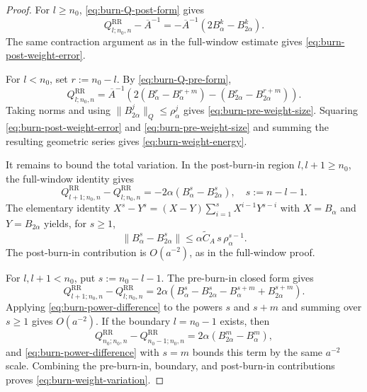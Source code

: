 \begin{proof} For $l \ge n_{0}$, \eqref{eq:burn-Q-post-form} gives
\[
Q_{l; n_{0}, n}^{\mathrm{RR}} - \overline{A}^{-1}
  = -\overline{A}^{-1} \left( 2 B_{\alpha}^{k} - B_{2 \alpha}^{k} \right).
\]
The same contraction argument as in the full-window estimate gives
\eqref{eq:burn-post-weight-error}.

For $l < n_{0}$, set $r := n_{0} - l$. By \eqref{eq:burn-Q-pre-form},
\[
Q_{l; n_{0}, n}^{\mathrm{RR}}
  = \overline{A}^{-1} \left( 2 \left( B_{\alpha}^{r} - B_{\alpha}^{r + m} \right)
      - \left( B_{2 \alpha}^{r} - B_{2 \alpha}^{r + m} \right) \right).
\]
Taking norms and using $\lVert B_{2 \alpha}^{j} \rVert_{Q} \le \rho_{\alpha}^{j}$ gives
\eqref{eq:burn-pre-weight-size}. Squaring \eqref{eq:burn-post-weight-error} and
\eqref{eq:burn-pre-weight-size} and summing the resulting geometric series gives
\eqref{eq:burn-weight-energy}.

It remains to bound the total variation. In the post-burn-in region
$l, l + 1 \ge n_{0}$, the full-window identity gives
\[
Q_{l + 1; n_{0}, n}^{\mathrm{RR}} - Q_{l; n_{0}, n}^{\mathrm{RR}}
  = -2 \alpha \left( B_{\alpha}^{s} - B_{2 \alpha}^{s} \right),
\quad s := n - l - 1.
\]
The elementary identity
$X^{s} - Y^{s} = (X - Y) \sum_{i = 1}^{s} X^{i - 1} Y^{s - i}$ with
$X = B_{\alpha}$ and $Y = B_{2 \alpha}$ yields, for $s \ge 1$,
\begin{equation}
\lVert B_{\alpha}^{s} - B_{2 \alpha}^{s} \rVert
  \le \alpha \tilde{C}_{A} \, s \, \rho_{\alpha}^{s - 1}.
\label{eq:burn-power-difference}
\end{equation}
The post-burn-in contribution is $O(a^{-2})$, as in the full-window proof.

For $l, l + 1 < n_{0}$, put $s := n_{0} - l - 1$. The pre-burn-in closed form gives
\[
Q_{l + 1; n_{0}, n}^{\mathrm{RR}} - Q_{l; n_{0}, n}^{\mathrm{RR}}
  = 2 \alpha \left( B_{\alpha}^{s} - B_{2 \alpha}^{s}
      - B_{\alpha}^{s + m} + B_{2 \alpha}^{s + m} \right).
\]
Applying \eqref{eq:burn-power-difference} to the powers $s$ and $s + m$ and summing
over $s \ge 1$ gives $O(a^{-2})$. If the boundary
$l = n_{0} - 1$ exists, then
\[
Q_{n_{0}; n_{0}, n}^{\mathrm{RR}} - Q_{n_{0} - 1; n_{0}, n}^{\mathrm{RR}}
  = 2 \alpha \left( B_{2 \alpha}^{m} - B_{\alpha}^{m} \right),
\]
and \eqref{eq:burn-power-difference} with $s = m$ bounds this term by the same
$a^{-2}$ scale. Combining the pre-burn-in, boundary, and post-burn-in
contributions proves \eqref{eq:burn-weight-variation}. \end{proof}
